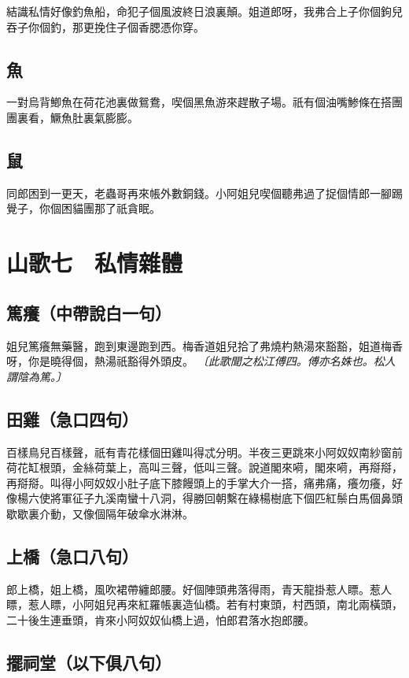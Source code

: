 結識私情好像釣魚船，命犯子個風波終日浪裏顛。姐道郎呀，我弗合上子你個鉤兒吞子你個釣，那更挽住子個香腮憑你穿。

\subsection*{魚}

一對烏背鯽魚在荷花池裏做鴛鴦，喫個黑魚游來趕散子場。祇有個油嘴鯵條在搭團團裏看，鱖魚肚裏氣膨膨。

\subsection*{鼠}

同郎困到一更天，老蟲哥再來帳外數銅錢。小阿姐兒喫個聽弗過了捉個情郎一腳踢覺子，你個困貓團那了祇貪眠。


\section*{山歌七　私情雜體}
\subsection*{篤癢（中帶說白一句）}

姐兒篤癢無藥醫，跑到東邊跑到西。梅香道姐兒拾了弗燒杓熱湯來豁豁，姐道梅香呀，你是曉得個，熱湯祇豁得外頭皮。
\textit{〔此歌聞之松江傅四。傅亦名姝也。松人謂陰為篤。〕}

\subsection*{田雞（急口四句）}

百樣鳥兒百樣聲，祇有青花樣個田雞叫得忒分明。半夜三更跳來小阿奴奴南紗窗前荷花缸根頭，金絲荷葉上，高叫三聲，低叫三聲。說道閣來嗬，閣來嗬，再搿搿，再搿搿。叫得小阿奴奴小肚子底下膝饅頭上的手掌大介一搭，痛弗痛，癢勿癢，好像楊六使將軍征子九溪南蠻十八洞，得勝回朝繫在綠楊樹底下個匹紅鬃白馬個鼻頭歇歇裏介動，又像個隔年破傘水淋淋。

\subsection*{上橋（急口八句）}

郎上橋，姐上橋，風吹裙帶纏郎腰。好個陣頭弗落得雨，青天龍掛惹人瞟。惹人瞟，惹人瞟，小阿姐兒再來紅羅帳裏造仙橋。若有村東頭，村西頭，南北兩橫頭，二十後生連垂頭，肯來小阿奴奴仙橋上過，怕郎君落水抱郎腰。

\subsection*{擺祠堂（以下俱八句）}

